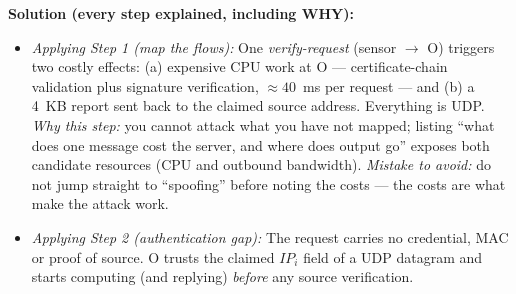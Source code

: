 \documentclass[12pt, a4paper]{article}
\begin{document}
\textbf{Solution (every step explained, including WHY):}
\begin{itemize}
    \item \textit{Applying Step 1 (map the flows):} One \emph{verify-request} (sensor $\rightarrow$ O) triggers two costly effects: (a) expensive CPU work at O --- certificate-chain validation plus signature verification, $\approx 40$~ms per request --- and (b) a 4~KB report sent back to the claimed source address.
    Everything is UDP. \emph{Why this step:} you cannot attack what you have not mapped; listing ``what does one message cost the server, and where does output go'' exposes both candidate resources (CPU and outbound bandwidth).
    \emph{Mistake to avoid:} do not jump straight to ``spoofing'' before noting the costs --- the costs are what make the attack work.
    \item \textit{Applying Step 2 (authentication gap):} The request carries no credential, MAC or proof of source. O trusts the claimed $IP_i$ field of a UDP datagram and starts computing (and replying) \emph{before} any source verification.


\end{itemize}
\end{document}
